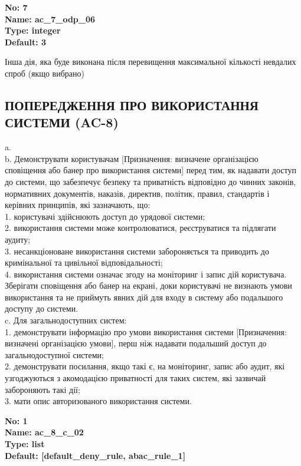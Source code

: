 \documentclass{article}
\begin{document}
{\footnotesize\bfseries
No: 7\\
Name: ac\_\allowbreak{}7\_\allowbreak{}odp\_\allowbreak{}06\\
Type: integer\\
Default: 3
}

{\footnotesize Інша дія, яка буде виконана після перевищення максимальної кількості невдалих спроб (якщо вибрано)}




\subsection{ПОПЕРЕДЖЕННЯ ПРО ВИКОРИСТАННЯ СИСТЕМИ (AC-8)}
a.\\ 
b. Демонструвати користувачам [Призначення: визначене організацією сповіщення або банер про використання системи] перед тим, як надавати доступ до системи, що забезпечує безпеку та приватність відповідно до чинних законів, нормативних документів, наказів, директив, політик, правил, стандартів і керівних принципів, які зазначають, що:\\ 
1. користувачі здійснюють доступ до урядової системи;\\ 
2. використання системи може контролюватися, реєструватися та підлягати аудиту;\\ 
3. несанкціоноване використання системи забороняється та приводить до кримінальної та цивільної відповідальності;\\ 
4. використання системи означає згоду на моніторинг і запис дій користувача. Зберігати сповіщення або банер на екрані, доки користувачі не визнають умови використання та не приймуть явних дій для входу в систему або подальшого доступу до системи.\\ 
c. Для загальнодоступних систем:\\ 
1. демонструвати інформацію про умови використання системи [Призначення: визначені організацією умови], перш ніж надавати подальший доступ до загальнодоступної системи;\\ 
2. демонструвати посилання, якщо такі є, на моніторинг, запис або аудит, які узгоджуються з акомодацією приватності для таких систем, які зазвичай забороняють такі дії;\\ 
3. мати опис авторизованого використання системи.

\vspace{10pt}
{\footnotesize\bfseries
No: 1\\
Name: ac\_\allowbreak{}8\_\allowbreak{}c\_\allowbreak{}02\\
Type: list\\
Default: [\textquotedbl{}default\_\allowbreak{}deny\_\allowbreak{}rule\textquotedbl{}, \textquotedbl{}abac\_\allowbreak{}rule\_\allowbreak{}1\textquotedbl{}]
}
\end{document}

